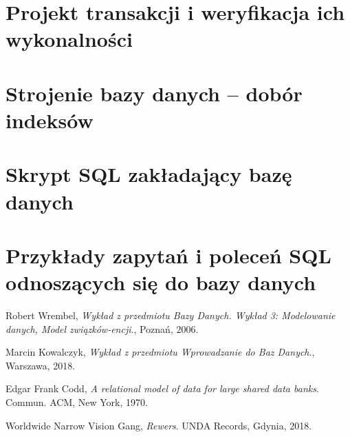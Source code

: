 \documentclass{mwrep}
\begin{document}
\section{Projekt transakcji i weryfikacja ich wykonalności}

\section{Strojenie bazy danych – dobór indeksów}

\section{Skrypt SQL zakładający bazę danych}

\section{Przykłady zapytań i poleceń SQL odnoszących się do bazy danych}

\begin{thebibliography}{9}
	  Robert Wrembel,
	  \emph{Wykład z przedmiotu Bazy Danych. Wykład 3: Modelowanie danych, Model związków-encji}.,
	  Poznań,
	  2006.

	
	  Marcin Kowalczyk,
	  \emph{Wykład z przedmiotu Wprowadzanie do Baz Danych}.,
	  Warszawa,
	  2018.

	  Edgar Frank Codd,
	  \emph{A relational model of data for large shared data banks}.
	  Commun. ACM,
	  New York,
	  1970.

	  Worldwide Narrow Vision Gang,
	  \emph{Rewers}.
	  UNDA Records,
	  Gdynia,
	  2018.
	
	\end{thebibliography}
\end{document}
